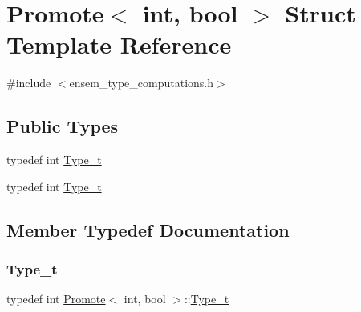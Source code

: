 \hypertarget{structPromote_3_01int_00_01bool_01_4}{}\section{Promote$<$ int, bool $>$ Struct Template Reference}
\label{structPromote_3_01int_00_01bool_01_4}


{\ttfamily \#include $<$ensem\+\_\+type\+\_\+computations.\+h$>$}

\subsection*{Public Types}
\begin{DoxyCompactItemize}
\item 
typedef int \mbox{\hyperlink{structPromote_3_01int_00_01bool_01_4_ac7c77d48ab422ab631e128719c53a30b}{Type\+\_\+t}}
\item 
typedef int \mbox{\hyperlink{structPromote_3_01int_00_01bool_01_4_ac7c77d48ab422ab631e128719c53a30b}{Type\+\_\+t}}
\end{DoxyCompactItemize}


\subsection{Member Typedef Documentation}
\mbox{\label{structPromote_3_01int_00_01bool_01_4_ac7c77d48ab422ab631e128719c53a30b}} 
\subsubsection{\texorpdfstring{Type\_t}{Type\_t}\hspace{0.1cm}{\footnotesize\ttfamily [1/2]}}
{\footnotesize\ttfamily typedef int \mbox{\hyperlink{structPromote}{Promote}}$<$ int, bool $>$\+::\mbox{\hyperlink{structPromote_3_01int_00_01bool_01_4_ac7c77d48ab422ab631e128719c53a30b}{Type\+\_\+t}}}

\mbox{\label{structPromote_3_01int_00_01bool_01_4_ac7c77d48ab422ab631e128719c53a30b}} 
